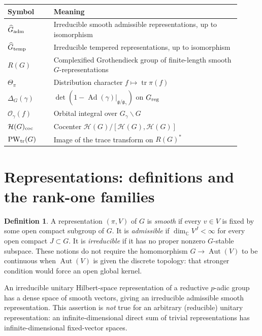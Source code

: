 \documentclass[12pt,letterpaper]{amsart}
\numberwithin{equation}{section}
\theoremstyle{definition}
\newtheorem{definition}[theorem]{Definition}
\theoremstyle{remark}
\newcommand{\calH}{\mathcal H}
\newcommand{\tr}{\operatorname{tr}}
\newcommand{\Ad}{\operatorname{Ad}}
\newcommand{\PW}{\operatorname{PW}}
\begin{document}
\begin{center}\small
\begin{tabular}{@{}p{0.18\linewidth}p{0.73\linewidth}@{}}\toprule
Symbol & Meaning \\\midrule
$\widehat G_{\rm adm}$ & Irreducible smooth admissible representations, up to isomorphism \\
$\widehat G_{\rm temp}$ & Irreducible tempered representations, up to isomorphism \\
$R(G)$ & Complexified Grothendieck group of finite-length smooth $G$-representations \\
$\Theta_\pi$ & Distribution character $f\mapsto\tr\pi(f)$ \\
$\Delta_G(\gamma)$ & $\det(1-\Ad(\gamma)|_{\mathfrak g/\mathfrak g_\gamma})$ on $G_{\rm reg}$ \\
$\mathcal O_\gamma(f)$ & Orbital integral over $G_\gamma\backslash G$ \\
$\calH(G)_{\rm coc}$ & Cocenter $\calH(G)/[\calH(G),\calH(G)]$ \\
$\PW_{\rm tr}(G)$ & Image of the trace transform on $R(G)^*$ \\\bottomrule
\end{tabular}
\end{center}

\section{Representations: definitions and the rank-one families}\label{sec:rep}
\begin{definition}
A representation $(\pi,V)$ of $G$ is \emph{smooth} if every $v\in V$ is fixed by some open compact subgroup of $G$. It is \emph{admissible} if $\dim_{\mathbb C}V^J<\infty$ for every open compact $J\subset G$.  It is \emph{irreducible} if it has no proper nonzero $G$-stable subspace.  These notions do not require the homomorphism $G\to\operatorname{Aut}(V)$ to be continuous when $\operatorname{Aut}(V)$ is given the discrete topology: that stronger condition would force an open global kernel.
\end{definition}
An irreducible unitary Hilbert-space representation of a reductive $p$-adic group has a dense space of smooth vectors, giving an irreducible admissible smooth representation.  This assertion is \emph{not} true for an arbitrary (reducible) unitary representation: an infinite-dimensional direct sum of trivial representations has infinite-dimensional fixed-vector spaces.
\end{document}
